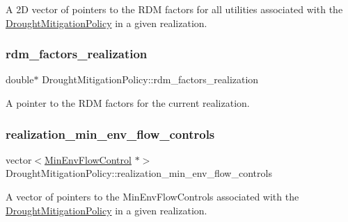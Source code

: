 A 2D vector of pointers to the R\+DM factors for all utilities associated with the \mbox{\hyperlink{classDroughtMitigationPolicy}{Drought\+Mitigation\+Policy}} in a given realization. 

\mbox{\label{classDroughtMitigationPolicy_abef5c917bbc076514fe61bfebbd0e4fc}} 
\subsubsection{\texorpdfstring{rdm\+\_\+factors\+\_\+realization}{rdm\_factors\_realization}}
{\footnotesize\ttfamily double$\ast$ Drought\+Mitigation\+Policy\+::rdm\+\_\+factors\+\_\+realization\hspace{0.3cm}{\ttfamily [protected]}}



A pointer to the R\+DM factors for the current realization. 

\mbox{\label{classDroughtMitigationPolicy_af583979405bc5d530ee576df8a6e9324}} 
\subsubsection{\texorpdfstring{realization\+\_\+min\+\_\+env\+\_\+flow\+\_\+controls}{realization\_min\_env\_flow\_controls}}
{\footnotesize\ttfamily vector$<$\mbox{\hyperlink{classMinEnvFlowControl}{Min\+Env\+Flow\+Control}} $\ast$$>$ Drought\+Mitigation\+Policy\+::realization\+\_\+min\+\_\+env\+\_\+flow\+\_\+controls\hspace{0.3cm}{\ttfamily [protected]}}



A vector of pointers to the Min\+Env\+Flow\+Controls associated with the \mbox{\hyperlink{classDroughtMitigationPolicy}{Drought\+Mitigation\+Policy}} in a given realization. 

